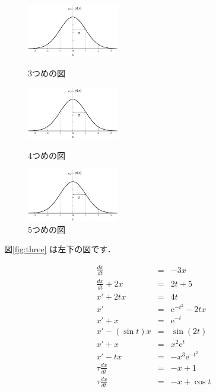 \documentclass[a4paper,11pt]{jarticle}
\begin{document}
\begin{figure}[htbp]
 \begin{minipage}{0.33\hsize}
  \begin{center}
   \includegraphics[width=40mm]{gauss001.eps}
  \end{center}
  \caption{3つめの図}
  \label{fig:three}
 \end{minipage}
 \begin{minipage}{0.33\hsize}
 \begin{center}
  \includegraphics[width=40mm]{gauss001.eps}
 \end{center}
  \caption{4つめの図}
  \label{fig:four}
 \end{minipage}
 \begin{minipage}{0.33\hsize}
 \begin{center}
  \includegraphics[width=40mm]{gauss001.eps}
 \end{center}
  \caption{5つめの図}
  \label{fig:five}
 \end{minipage}
\end{figure}


図\ref{fig:three} は左下の図です．

\lhead{}
\rhead{}


\begin{eqnarray}
\frac{dx}{dt}   & = &  - 3x \\
\frac{dx}{dt}  +2x  & = & 2t + 5 \\
x' + 2tx & = & 4t  \\
x' & = & \mathrm{e}^{-t^2} -2tx \\
x' + x & = &  \mathrm{e}^{-t} \\
x' - (\sin t) x  & = &  \sin (2t) \\
x' + x  & = &  x^2 \mathrm{e}^t \\
x' - tx   & = &  - x^3 \mathrm{e}^{-t^2}  \\
\tau \frac{dx}{dt} & = &   -x + 1 \\
\tau \frac{dx}{dt} & = &   -x + \cos t 
\end{eqnarray}
\end{document}
